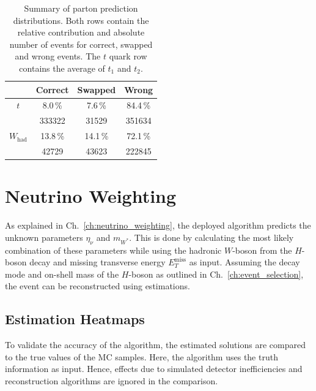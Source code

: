 \documentclass[bachelor,ngerman,english]{GAUBM}
\begin{document}
\begin{table}
    \centering
    \caption{Summary of \spanets parton prediction distributions. Both rows contain the relative contribution and absolute number of events for correct, swapped and wrong events. The $t$ quark row contains the average of $t_1$ and $t_2$.}
    \begin{tabular}{c|c|c|c}
        & Correct & Swapped & Wrong \\
        \hline
        $t$ & 8.0\,\% & 7.6\,\% & 84.4\,\%\\
        & 333322 & 31529 & 351634\\
        \hline
        $W_\text{had}$ & 13.8\,\% & 14.1\,\% & 72.1\,\%\\
        & 42729 & 43623 & 222845\\
    \end{tabular}
    \label{tab:results:spanet:probability_yields}
\end{table}

\section{Neutrino Weighting}
\label{sec:results:neutrino_weighting}
As explained in Ch.~\ref{ch:neutrino_weighting}, the deployed \NW algorithm predicts the unknown parameters $\eta_\nu$ and $m_{W^*}$. This is done by calculating the most likely combination of these parameters while using the hadronic $W$-boson from the $H$-boson decay and missing transverse energy $E_T^\text{miss}$ as input. Assuming the decay mode and on-shell mass of the $H$-boson as outlined in Ch.~\ref{ch:event_selection}, the event can be reconstructed using \NW estimations.


\subsection*{Estimation Heatmaps}
To validate the accuracy of the \NW algorithm, the estimated solutions are compared to the true values of the MC samples. Here, the \NW algorithm uses the truth information as input. Hence, effects due to simulated detector inefficiencies and reconstruction algorithms are ignored in the comparison. 
\end{document}

